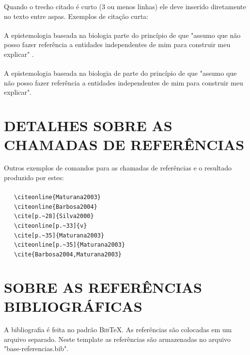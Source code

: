 Quando o trecho citado é curto (3 ou menos linhas) ele deve inserido diretamente no texto entre aspas. Exemplos de citação curta:\\
\\A epistemologia baseada na biologia parte do princípio de que "assumo que não posso fazer referência a entidades independentes de mim para construir meu explicar" \cite[p.~35]{Maturana2003}.\\
\\A epistemologia baseada na biologia de  parte do princípio de que "assumo que não posso fazer referência a entidades independentes de mim para construir meu explicar".

\chapter{DETALHES SOBRE AS CHAMADAS DE REFERÊNCIAS}
\label{chap:referUtilizadas}

Outros exemplos de comandos para as chamadas de referências e o resultado produzido por estes:\\
\\ \ \ \  \verb|\citeonline{Maturana2003}|\\
 \ \ \   \verb|\citeonline{Barbosa2004}|\\
\cite[p.~28]{Silva2000} \ \ \  \verb|\cite[p.~28]{Silva2000}|\\
 \ \ \   \verb|\citeonline[p.~33]{v}|\\
\cite[p.~35]{Maturana2003} \ \ \   \verb|\cite[p.~35]{Maturana2003}|\\
 \ \ \   \verb|\citeonline[p.~35]{Maturana2003}|\\
\cite{Barbosa2004,Maturana2003} \ \ \   \verb|\cite{Barbosa2004,Maturana2003}|\\

\chapter{SOBRE AS REFERÊNCIAS BIBLIOGRÁFICAS}
\label{chap:apSobreRefer}

A bibliografia é feita no padrão \textsc{Bib}\TeX{}. As referências são colocadas em um arquivo separado. Neste template as referências são armazenadas no arquivo "base-referencias.bib".

